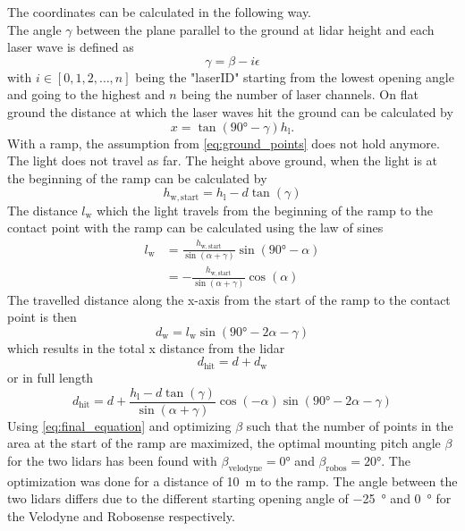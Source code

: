The coordinates can be calculated in the following way.\\
The angle $\gamma$ between the plane parallel to the ground at \gls{lidar} height and each laser wave is defined as
\begin{equation}
	\gamma = \beta - i\epsilon
\end{equation}
with $i \in [0,1,2,\dots,n]$ being the "laserID" starting from the lowest opening angle and going to the highest and $n$ being the number of laser channels.
On flat ground the distance at which the laser waves hit the ground can be calculated by
\begin{equation}
	x = \tan(\ang{90} - \gamma) h_\mathrm{l}.
	\label{eq:ground_points}
\end{equation}
With a ramp, the assumption from \cref{eq:ground_points} does not hold anymore.
The light does not travel as far.
The height above ground, when the light is at the beginning of the ramp can be calculated by
\begin{equation}
	h_\mathrm{w,start} = h_\mathrm{l} - d\tan(\gamma)
\end{equation}
The distance $l_\mathrm{w}$ which the light travels from the beginning of the ramp to the contact point with the ramp can be calculated using the law of sines
\begin{align}
	l_\mathrm{w} & = \frac{h_\mathrm{w,start} }{\sin(\alpha + \gamma)} \sin(\ang{90} - \alpha) \\
	             & = -\frac{h_\mathrm{w,start} }{\sin(\alpha + \gamma)} \cos(\alpha)
\end{align}
The travelled distance along the x-axis from the start of the ramp to the contact point is then
\begin{equation}
	d_\mathrm{w}  = l_\mathrm{w} \sin(\ang{90} - 2\alpha - \gamma)
\end{equation}
which results in the total x distance from the \gls{lidar}
\begin{equation}
	d_\mathrm{hit} = d + d_\mathrm{w}
\end{equation}
or in full length
\begin{equation}
	\label{eq:final_equation}
	d_\mathrm{hit} = d + \frac{h_\mathrm{l} - d\tan(\gamma)}{\sin(\alpha + \gamma)} \cos(-\alpha) \sin(\ang{90} - 2\alpha - \gamma)
\end{equation}
Using \cref{eq:final_equation} and optimizing $\beta$ such that the number of points in the area at the start of the ramp are maximized, the optimal mounting pitch angle $\beta$ for the two \gls{lidar}s has been found with $\beta_\mathrm{velodyne} = \ang{0}$ and $\beta_\mathrm{robos} = \ang{20}$.
The optimization was done for a distance of \SI{10}{\metre} to the ramp.
The angle between the two \gls{lidar}s differs due to the different starting opening angle of \SI{-25}{\degree} and \SI{0}{\degree} for the Velodyne and Robosense respectively.


